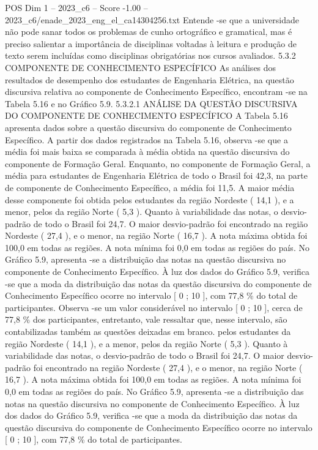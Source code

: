 \begin{textsample}{POS Dim 1 – 2023\_c6 – Score -1.00 – 2023\_c6/enade\_2023\_eng\_el\_ca14304256.txt}
Entende -se que a universidade não pode sanar todos os problemas de cunho ortográfico e gramatical, mas é preciso salientar a importância de disciplinas voltadas à leitura e produção de texto serem incluídas como disciplinas obrigatórias nos cursos avaliados. 5.3.2 COMPONENTE DE CONHECIMENTO ESPECÍFICO As análises dos resultados de desempenho dos estudantes de Engenharia Elétrica, na questão discursiva relativa ao componente de Conhecimento Específico, encontram -se na Tabela 5.16 e no Gráfico 5.9. 5.3.2.1 ANÁLISE DA QUESTÃO DISCURSIVA DO COMPONENTE DE CONHECIMENTO ESPECÍFICO A Tabela 5.16 apresenta dados sobre a questão discursiva do componente de Conhecimento Específico.
A partir dos dados registrados na Tabela 5.16, observa -se que a média foi mais baixa se comparada à média obtida na questão discursiva do componente de Formação Geral.
Enquanto, no componente de Formação Geral, a média para estudantes de Engenharia Elétrica de todo o Brasil foi 42,3, na parte de componente de Conhecimento Específico, a média foi 11,5.
A maior média desse componente foi obtida pelos estudantes da região Nordeste ( 14,1 ), e a menor, pelos da região Norte ( 5,3 ).
Quanto à variabilidade das notas, o desvio-padrão de todo o Brasil foi 24,7.
O maior desvio-padrão foi encontrado na região Nordeste ( 27,4 ), e o menor, na região Norte ( 16,7 ).
A nota máxima obtida foi 100,0 em todas as regiões.
A nota mínima foi 0,0 em todas as regiões do país.
No Gráfico 5.9, apresenta -se a distribuição das notas na questão discursiva no componente de Conhecimento Específico.
À luz dos dados do Gráfico 5.9, verifica -se que a moda da distribuição das notas da questão discursiva do componente de Conhecimento Específico ocorre no intervalo [ 0 ; 10 ], com 77,8 \% do total de participantes.
Observa -se um valor considerável no intervalo [ 0 ; 10 ], cerca de 77,8 \% dos participantes, entretanto, vale ressaltar que, nesse intervalo, são contabilizadas também as questões deixadas em branco. pelos estudantes da região Nordeste ( 14,1 ), e a menor, pelos da região Norte ( 5,3 ).
Quanto à variabilidade das notas, o desvio-padrão de todo o Brasil foi 24,7.
O maior desvio-padrão foi encontrado na região Nordeste ( 27,4 ), e o menor, na região Norte ( 16,7 ).
A nota máxima obtida foi 100,0 em todas as regiões.
A nota mínima foi 0,0 em todas as regiões do país.
No Gráfico 5.9, apresenta -se a distribuição das notas na questão discursiva no componente de Conhecimento Específico.
À luz dos dados do Gráfico 5.9, verifica -se que a moda da distribuição das notas da questão discursiva do componente de Conhecimento Específico ocorre no intervalo [ 0 ; 10 ], com 77,8 \% do total de participantes.

\end{textsample}
